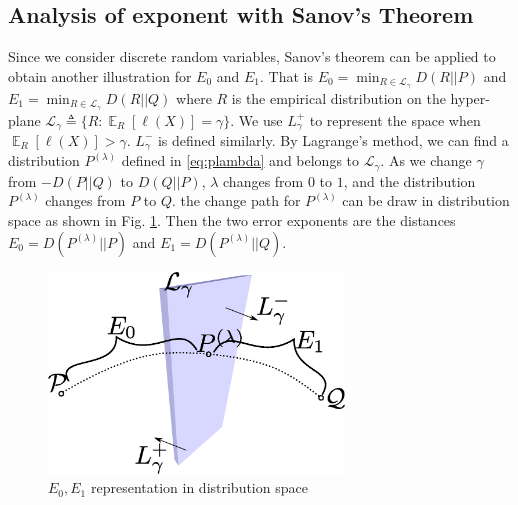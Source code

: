 \documentclass{article}
\DeclareMathOperator{\E}{\mathbb{E}}
\begin{document}
\subsection{Analysis of exponent with Sanov's Theorem}
Since we consider discrete random variables, Sanov's theorem
can be applied to obtain another illustration for $E_0$
and $E_1$.
That is $E_0 = \min_{R\in \mathcal{L}_{\gamma}}D(R || P)$ and $E_1=\min_{R\in \mathcal{L}_{\gamma}}D(R ||Q)$ where
$R$ is the empirical distribution on the hyper-plane
$\mathcal{L}_{\gamma}\triangleq\{R: \E_R[\ell(X)]=\gamma \}$.
We use $L_{\gamma}^+$ to represent the space when
$\E_R[\ell(X)]>\gamma$. $L_{\gamma}^-$
is defined similarly.
By Lagrange's method, we can find a distribution $P^{(\lambda)}$
defined in \eqref{eq:plambda} and belongs to $\mathcal{L}_{\gamma}$.
As we change $\gamma$ from $-D(P||Q)$ to $D(Q||P)$, $\lambda$ changes
from $0$ to $1$, and the distribution $P^{(\lambda)}$ changes from
$P$ to $Q$. the change path for $P^{(\lambda)}$ can be draw in
distribution space as shown in Fig. \ref{fig:ds}.
Then the two error exponents are the distances
$E_0 = D(P^{(\lambda)} || P)$ and $E_1=D(P^{(\lambda)} ||Q)$.
\begin{figure}
    \centering
    \includegraphics[width=0.7\textwidth]{distributional_space.eps}
    \caption{$E_0, E_1$ representation in distribution space}
    \label{fig:ds}
\end{figure}
\end{document}
